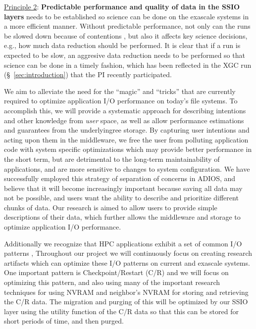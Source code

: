 \underline{Principle 2}: {\bf Predictable performance and quality of data in the SSIO layers} needs to be
established so science can be done on the exascale systems in a more efficient manner. Without
predictable performance, not only can the runs be slowed down because of contentions \cite{liu_hotstorage}, 
but also it affects key science decisions, e.g., how much data reduction should be performed.
It is clear that if a run is expected to be slow, an aggresive data reduction needs to be performed
so that science can be done in a timely fashion, which has been reflected in the XGC run (\S~\ref{sec:introduction})
that the PI recently participated.

We aim to alleviate the need for the ``magic'' and ``tricks''
that are currently required to optimize application I/O performance
on today's file systems. To accomplish this, we will provide a systematic
approach for describing intentions and other knowledge from {\it user}
space, as well as allow performance estimations and guarantees 
from the underlyingree storage.
By capturing user intentions and acting upon them in the middleware, we
free the user from polluting application code with system specific
optimizations which may provide better performance in the short term,
but are detrimental to the long-term maintainability of applications, and
are more sensitive to changes to system configuration. We have successfully
employed this strategy of separation of concerns in ADIOS, and believe that
it will become increasingly important because saving all data may not be possible, and
users want the ability to describe and prioritize different chunks of data. 
Our research is aimed to allow users to provide simple descriptions of their data,
which further allows the middleware and storage to optimize application I/O performance.

Additionally we recognize that HPC applications exhibit a set
of common I/O patterns \cite{lofstead2011six,polte2009and,tian2011edo,tian2012system},
Throughout our project we will continuously focus on creating research artifacts 
which can optimize these I/O patterns on current and
exascale systems. One important pattern is Checkpoint/Restart (C/R) and we will focus on optimizing this pattern,
 and also using many of the important research techniques for using NVRAM and neighbor's NVRAM for storing and retrieving
the C/R data. The migration and purging of this will be optimized by our SSIO layer using the utility function of the C/R data so that this can be stored for short periods of time, and then purged. 



